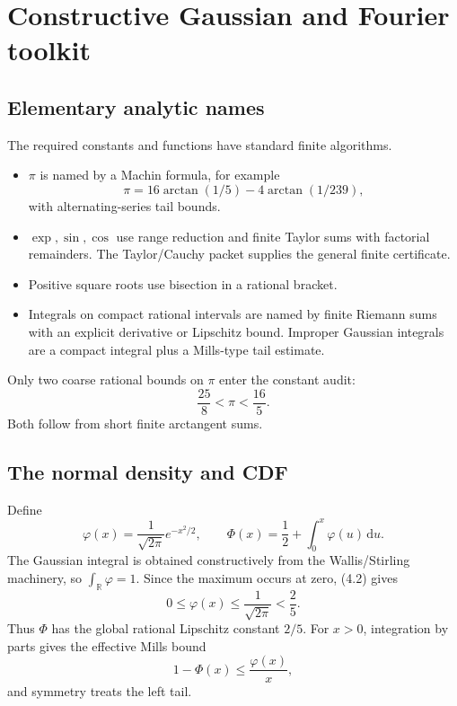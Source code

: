 \documentclass[11pt]{article}
\newcommand{\R}{\mathbb R}
\newcommand{\dd}{\,\mathrm d}
\newcommand{\PhiN}{\Phi}
\newcommand{\phiN}{\varphi}
\begin{document}
\section{Constructive Gaussian and Fourier toolkit}\label{sec:gaussian}

\subsection{Elementary analytic names}

The required constants and functions have standard finite algorithms.

\begin{itemize}
\item \(\pi\) is named by a Machin formula, for example
\[
 \pi=16\arctan(1/5)-4\arctan(1/239),                  \tag{4.1}
\]
with alternating-series tail bounds.
\item \(\exp,\sin,\cos\) use range reduction and finite Taylor sums with
factorial remainders.  The Taylor/Cauchy packet supplies the general finite
certificate.
\item Positive square roots use bisection in a rational bracket.
\item Integrals on compact rational intervals are named by finite Riemann
sums with an explicit derivative or Lipschitz bound.  Improper Gaussian
integrals are a compact integral plus a Mills-type tail estimate.
\end{itemize}

Only two coarse rational bounds on \(\pi\) enter the constant audit:
\[
 \frac{25}{8}<\pi<\frac{16}{5}.                       \tag{4.2}
\]
Both follow from short finite arctangent sums.

\subsection{The normal density and CDF}

Define
\[
 \phiN(x)=\frac{1}{\sqrt{2\pi}}e^{-x^2/2},
 \qquad
 \PhiN(x)=\frac12+\int_0^x\phiN(u)\dd u.              \tag{4.3}
\]
The Gaussian integral is obtained constructively from the Wallis/Stirling
machinery, so \(\int_{\R}\phiN=1\).  Since the maximum occurs at zero,
(4.2) gives
\[
 0\le\phiN(x)\le\frac1{\sqrt{2\pi}}<\frac25.          \tag{4.4}
\]
Thus \(\PhiN\) has the global rational Lipschitz constant \(2/5\).
For \(x>0\), integration by parts gives the effective Mills bound
\[
 1-\PhiN(x)\le\frac{\phiN(x)}{x},                     \tag{4.5}
\]
and symmetry treats the left tail.
\end{document}

